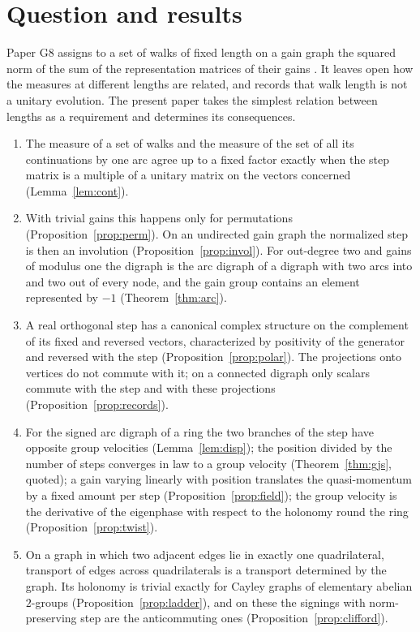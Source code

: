 \section{Question and results}

Paper G8 assigns to a set of walks of fixed length on a gain graph the squared norm of the sum of the representation matrices of their gains \cite{g8}. It leaves open how the measures at different lengths are related, and records that walk length is not a unitary evolution. The present paper takes the simplest relation between lengths as a requirement and determines its consequences.

\begin{enumerate}[label=(\roman*)]
\item The measure of a set of walks and the measure of the set of all its continuations by one arc agree up to a fixed factor exactly when the step matrix is a multiple of a unitary matrix on the vectors concerned (Lemma~\ref{lem:cont}).
\item With trivial gains this happens only for permutations (Proposition~\ref{prop:perm}). On an undirected gain graph the normalized step is then an involution (Proposition~\ref{prop:invol}). For out-degree two and gains of modulus one the digraph is the arc digraph of a digraph with two arcs into and two out of every node, and the gain group contains an element represented by $-1$ (Theorem~\ref{thm:arc}).
\item A real orthogonal step has a canonical complex structure on the complement of its fixed and reversed vectors, characterized by positivity of the generator and reversed with the step (Proposition~\ref{prop:polar}). The projections onto vertices do not commute with it; on a connected digraph only scalars commute with the step and with these projections (Proposition~\ref{prop:records}).
\item For the signed arc digraph of a ring the two branches of the step have opposite group velocities (Lemma~\ref{lem:disp}); the position divided by the number of steps converges in law to a group velocity (Theorem~\ref{thm:gjs}, quoted); a gain varying linearly with position translates the quasi-momentum by a fixed amount per step (Proposition~\ref{prop:field}); the group velocity is the derivative of the eigenphase with respect to the holonomy round the ring (Proposition~\ref{prop:twist}).
\item On a graph in which two adjacent edges lie in exactly one quadrilateral, transport of edges across quadrilaterals is a transport determined by the graph. Its holonomy is trivial exactly for Cayley graphs of elementary abelian $2$-groups (Proposition~\ref{prop:ladder}), and on these the signings with norm-preserving step are the anticommuting ones (Proposition~\ref{prop:clifford}).
\end{enumerate}


